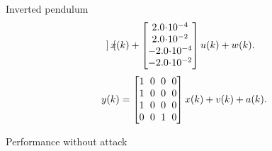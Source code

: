 \documentclass{beamer}
\begin{document}
\begin{frame}{Inverted pendulum}
{\begin{align*}
\begin{bmatrix}
   \end{bmatrix}x(k)+\begin{bmatrix}
   2.0\hspace{-2pt}\cdot\hspace{-2pt} 10^{-4}\\
   2.0\hspace{-2pt}\cdot\hspace{-2pt} 10^{-2}\\
   -2.0\hspace{-2pt}\cdot\hspace{-2pt} 10^{-4}\\
   -2.0\hspace{-2pt}\cdot\hspace{-2pt} 10^{-2}
   \end{bmatrix}
   u(k)+w(k).
   \end{align*}
   \begin{align*}
   y(k)=
   \begin{bmatrix}
   1\hspace{-2pt}&\hspace{-2pt} 0 \hspace{-2pt}&\hspace{-2pt}0 \hspace{-2pt}&\hspace{-2pt}0\\
   1\hspace{-2pt}&\hspace{-2pt} 0 \hspace{-2pt}&\hspace{-2pt}0 \hspace{-2pt}&\hspace{-2pt}0\\
   1\hspace{-2pt}&\hspace{-2pt} 0 \hspace{-2pt}&\hspace{-2pt}0 \hspace{-2pt}&\hspace{-2pt}0\\
   0\hspace{-2pt}&\hspace{-2pt} 0 \hspace{-2pt}&\hspace{-2pt}1 \hspace{-2pt}&\hspace{-2pt}0
   \end{bmatrix}x(k)+v(k)+a(k).
   \end{align*} }
\end{frame}
\begin{frame}{Performance without attack}
	\begin{figure}[htpb!]
		\centering
		\scalebox{0.65}{}
	\end{figure}
\end{frame}
\end{document}
